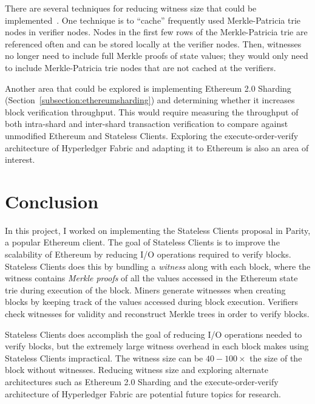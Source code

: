 \documentclass[12pt]{article}
\newcommand{\System}{Stateless Clients\xspace}
\begin{document}
There are several techniques for reducing witness size that could be implemented~\cite{ethereum-stateless-analysis}. One technique is to ``cache'' frequently used Merkle-Patricia trie nodes in verifier nodes. Nodes in the first few rows of the Merkle-Patricia trie are referenced often and can be stored locally at the verifier nodes. Then, witnesses no longer need to include full Merkle proofs of state values; they would only need to include Merkle-Patricia trie nodes that are not cached at the verifiers.

Another area that could be explored is implementing Ethereum 2.0 Sharding (Section~\ref{subsection:ethereumsharding}) and determining whether it increases block verification throughput. This would require measuring the throughput of both intra-shard and inter-shard transaction verification to compare against unmodified Ethereum and \System. Exploring the execute-order-verify architecture of Hyperledger Fabric and adapting it to Ethereum is also an area of interest.


\section{Conclusion}

In this project, I worked on implementing the \System proposal in Parity, a popular Ethereum client. The goal of \System is to improve the scalability of Ethereum by reducing I/O operations required to verify blocks. \System does this by bundling a \emph{witness} along with each block, where the witness contains \emph{Merkle proofs} of all the values accessed in the Ethereum state trie during execution of the block. Miners generate witnesses when creating blocks by keeping track of the values accessed during block execution. Verifiers check witnesses for validity and reconstruct Merkle trees in order to verify blocks.

\System does accomplish the goal of reducing I/O operations needed to verify blocks, but the extremely large witness overhead in each block makes using \System impractical. The witness size can be $40-100\times$ the size of the block without witnesses. Reducing witness size and exploring alternate architectures such as Ethereum 2.0 Sharding and the execute-order-verify architecture of Hyperledger Fabric are potential future topics for research.




\end{document}
